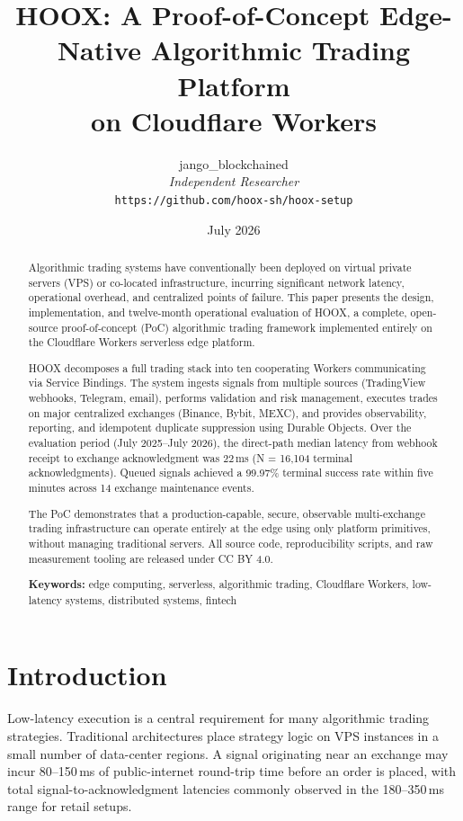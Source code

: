 \documentclass[10pt,a4paper]{article}
\title{\textbf{HOOX: A Proof-of-Concept Edge-Native Algorithmic Trading Platform\\on Cloudflare Workers}}
\author{
  jango\_blockchained\\
  \textit{Independent Researcher}\\
  \texttt{https://github.com/hoox-sh/hoox-setup}
}
\date{July 2026}
\newcommand{\textsc}[1]{\textsf{\small #1}}
\begin{document}
\maketitle

\begin{abstract}
Algorithmic trading systems have conventionally been deployed on virtual private servers (VPS) or co-located infrastructure, incurring significant network latency, operational overhead, and centralized points of failure. This paper presents the design, implementation, and twelve-month operational evaluation of \textsc{HOOX}, a complete, open-source proof-of-concept (PoC) algorithmic trading framework implemented entirely on the Cloudflare Workers serverless edge platform.

\textsc{HOOX} decomposes a full trading stack into ten cooperating Workers communicating via Service Bindings. The system ingests signals from multiple sources (TradingView webhooks, Telegram, email), performs validation and risk management, executes trades on major centralized exchanges (Binance, Bybit, MEXC), and provides observability, reporting, and idempotent duplicate suppression using Durable Objects. Over the evaluation period (July 2025--July 2026), the direct-path median latency from webhook receipt to exchange acknowledgment was 22\,ms (N = 16{,}104 terminal acknowledgments). Queued signals achieved a 99.97\% terminal success rate within five minutes across 14 exchange maintenance events.

The PoC demonstrates that a production-capable, secure, observable multi-exchange trading infrastructure can operate entirely at the edge using only platform primitives, without managing traditional servers. All source code, reproducibility scripts, and raw measurement tooling are released under CC BY 4.0.

\textbf{Keywords:} edge computing, serverless, algorithmic trading, Cloudflare Workers, low-latency systems, distributed systems, fintech
\end{abstract}

\section{Introduction}
\label{sec:intro}

Low-latency execution is a central requirement for many algorithmic trading strategies. Traditional architectures place strategy logic on VPS instances in a small number of data-center regions. A signal originating near an exchange may incur 80--150\,ms of public-internet round-trip time before an order is placed, with total signal-to-acknowledgment latencies commonly observed in the 180--350\,ms range for retail setups.
\end{document}
